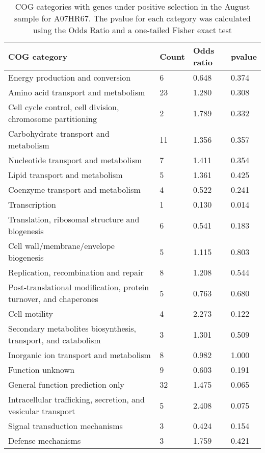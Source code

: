 \begin{table}[hb]
\footnotesize 
	\tabcolsep=0.11cm 
\caption{COG categories with genes under positive selection in the August sample for A07HR67. The pvalue for each category was calculated using the Odds Ratio and a one-tailed Fisher exact test} 
\begin{tabularx}{\textwidth}{L{6cm}R{2cm}R{2cm}R{2cm}} 
\hline 
\textbf{COG category} & \textbf{Count} & \textbf{Odds ratio} & \textbf{pvalue} \\ 
\hline 
Energy production and conversion & 6 & 0.648 & 0.374 \\ 
Amino acid transport and metabolism & 23 & 1.280 & 0.308 \\ 
Cell cycle control, cell division, chromosome partitioning & 2 & 1.789 & 0.332 \\ 
Carbohydrate transport and metabolism & 11 & 1.356 & 0.357 \\ 
Nucleotide transport and metabolism & 7 & 1.411 & 0.354 \\ 
Lipid transport and metabolism & 5 & 1.361 & 0.425 \\ 
Coenzyme transport and metabolism & 4 & 0.522 & 0.241 \\ 
Transcription & 1 & 0.130 & 0.014 \\ 
Translation, ribosomal structure and biogenesis & 6 & 0.541 & 0.183 \\ 
Cell wall/membrane/envelope biogenesis & 5 & 1.115 & 0.803 \\ 
Replication, recombination and repair & 8 & 1.208 & 0.544 \\ 
Post-translational modification, protein turnover, and chaperones & 5 & 0.763 & 0.680 \\ 
Cell motility & 4 & 2.273 & 0.122 \\ 
Secondary metabolites biosynthesis, transport, and catabolism & 3 & 1.301 & 0.509 \\ 
Inorganic ion transport and metabolism & 8 & 0.982 & 1.000 \\ 
Function unknown & 9 & 0.603 & 0.191 \\ 
General function prediction only & 32 & 1.475 & 0.065 \\ 
Intracellular trafficking, secretion, and vesicular transport & 5 & 2.408 & 0.075 \\ 
Signal transduction mechanisms & 3 & 0.424 & 0.154 \\ 
Defense mechanisms & 3 & 1.759 & 0.421 \\ 
\end{tabularx} 
\label{August_COG_Selection_A07HR67} 
 \end{table} 

